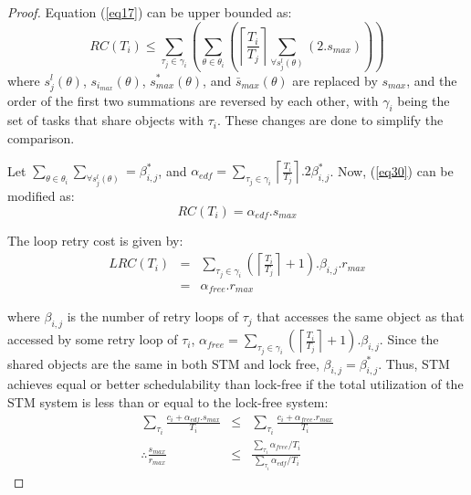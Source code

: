 \documentclass{sig-alternate}
\begin{document}
\begin{proof}
Equation (\ref{eq17}) can be upper bounded as:
\begin{equation}
RC\left(T_{i}\right) \le \sum_{\tau_{j}\in\gamma_{i}}\left(\sum_{\theta\in\theta_{i}}\left(\left\lceil\frac{T_{i}}{T_{j}}\right\rceil\sum_{\forall s_{j}^{l}\left(\theta\right)}\left(2.s_{max}\right)\right)\right)
\label{eq30}
\end{equation}
where $s_{j}^{l}\left(\theta\right)$, $s_{i_{max}}\left(\theta\right)$,
$s_{max}^{*}\left(\theta\right)$, and $\bar{s}_{max}\left(\theta\right)$ are replaced by $s_{max}$, and the order of the first two summations are reversed
by each other, 
with $\gamma_{i}$ being the set of tasks that share objects
with $\tau_{i}$. These changes are done to simplify the comparison.

Let $\sum_{\theta\in\theta_{i}}\sum_{\forall s_{j}^{l}\left(\theta\right)}=\beta_{i,j}^{*}$, and $\alpha_{edf}=\sum_{\tau_{j}\in\gamma_{i}}\left\lceil\frac{T_{i}}{T_{j}}\right\rceil.2\beta_{i,j}^*$. Now, (\ref{eq30}) can be modified as:
\begin{equation}
RC\left(T_{i}\right)=\alpha_{edf}.s_{max}
\label{eq31}
\end{equation}

The loop retry cost is given by:
\begin{eqnarray}
LRC\left(T_i\right)&=&\sum_{\tau_{j}\in\gamma_{i}}\left(\left\lceil\frac{T_{i}}{T_{j}}\right\rceil+1\right).\beta_{i,j}.r_{max}\nonumber \\
&=& \alpha_{free} . r_{max} \label{eq32}
\end{eqnarray}

where $\beta_{i,j}$ is the number of retry loops of $\tau_{j}$ that accesses the same object as that accessed by some retry loop of $\tau_{i}$, $\alpha_{free} = \sum_{\tau_{j}\in\gamma_{i}}\left(\left\lceil\frac{T_{i}}{T_{j}}\right\rceil + 1 \right).\beta_{i,j}$.
Since the shared objects are the same in both STM and lock free, $\beta_{i,j}=\beta_{i,j}^{*}$.
Thus, STM achieves equal or better schedulability 
than lock-free if the total utilization of the STM system is less than or equal to the lock-free system:
\begin{eqnarray}
\sum_{\tau_{i}}\frac{c_{i}+\alpha_{edf}.s_{max}} {T_{i}} & \le & \sum_{\tau_{i}}\frac{c_{i}+\alpha_{free}.r_{max}}{T_{i}} \nonumber \\
\therefore\frac{s_{max}}{r_{max}} & \le & \frac{\sum_{\tau_{i}}\alpha_{free}/T_{i}}{\sum_{\tau_{i}}\alpha_{edf}/T_{i}}\end{eqnarray}



\end{proof}
\end{document}
